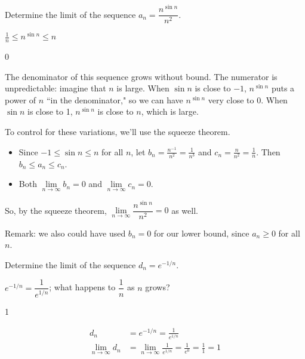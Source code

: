 \begin{Mquestion}
Determine the limit of the sequence
$a_n = \dfrac{n^{\sin n}}{n^2}$.
\end{Mquestion}
\begin{hint}
$\displaystyle\frac{1}{n}\leq n^{\sin n}\leq n$
\end{hint}
\begin{answer}
0
\end{answer}
\begin{solution}
The denominator of this sequence grows without bound. The numerator is unpredictable: imagine that $n$ is large. When $\sin n$ is close to $-1$, $n^{\sin n}$ puts a power of $n$ ``in the denominator," so we can have $n^{\sin n}$ very close to 0. When $\sin n$ is close to 1, $n^{\sin n}$ is close to $n$, which is large.

To control for these variations, we'll use the squeeze theorem.
\begin{itemize}
\item Since $-1 \leq \sin n \leq n$ for all $n$, let $b_n = \frac{n^{-1}}{n^2} = \frac{1}{n^3}$ and
$c_n = \frac{n}{n^2}=\frac{1}{n}$. Then $b_n \leq a_n \leq c_n$.
\item Both $\lim\limits_{n \to \infty}b_n=0$ and $\lim\limits_{n \to \infty}c_n=0$.
\end{itemize}
So, by the squeeze theorem,
$\lim\limits_{n \to \infty}\dfrac{n^{\sin n}}{n^2}=0$ as well.

Remark: we also could have used $b_n=0$ for our lower bound, since $a_n \geq 0$ for all $n$.
\end{solution}

\begin{Mquestion}
Determine the limit of the sequence
$d_n = e^{-1/n}$.
\end{Mquestion}
\begin{hint}
$e^{-1/n} = \dfrac{1}{e^{1/n}}$; what happens to $\dfrac{1}{n}$ as $n$ grows?
\end{hint}
\begin{answer}
1
\end{answer}
\begin{solution}
\begin{align*}
d_n&=e^{-1/n}=\frac{1}{e^{1/n}}\\
\lim_{n \to \infty }d_n&=\lim_{n \to \infty }\frac{1}{e^{1/n}} = \frac{1}{e^0}=\frac11=1
\end{align*}
\end{solution}

